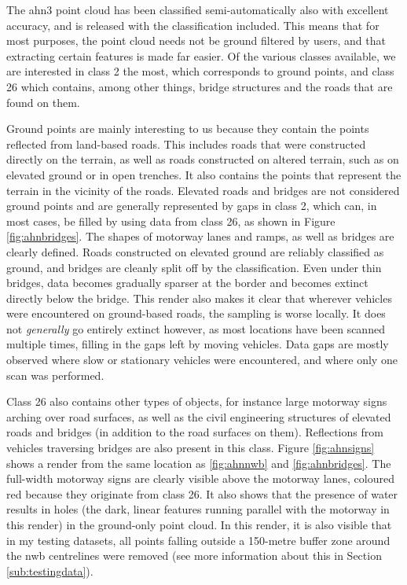 The \ac{ahn3} point cloud has been classified semi-automatically also with excellent accuracy, and is released with the classification included. This means that for most purposes, the point cloud needs not be ground filtered by users, and that extracting certain features is made far easier. Of the various classes available, we are interested in class 2 the most, which corresponds to ground points, and class 26 which contains, among other things, bridge structures and the roads that are found on them.

Ground points are mainly interesting to us because they contain the points reflected from land-based roads. This includes roads that were constructed directly on the terrain, as well as roads constructed on altered terrain, such as on elevated ground or in open trenches. It also contains the points that represent the terrain in the vicinity of the roads. Elevated roads and bridges are not considered ground points and are generally represented by gaps in class 2, which can, in most cases, be filled by using data from class 26, as shown in Figure \ref{fig:ahnbridges}. The shapes of motorway lanes and ramps, as well as bridges are clearly defined. Roads constructed on elevated ground are reliably classified as ground, and bridges are cleanly split off by the classification. Even under thin bridges, data becomes gradually sparser at the border and becomes extinct directly below the bridge. This render also makes it clear that wherever vehicles were encountered on ground-based roads, the sampling is worse locally. It does not \textit{generally} go entirely extinct however, as most locations have been scanned multiple times, filling in the gaps left by moving vehicles. Data gaps are mostly observed where slow or stationary vehicles were encountered, and where only one scan was performed.

Class 26 also contains other types of objects, for instance large motorway signs arching over road surfaces, as well as the civil engineering structures of elevated roads and bridges (in addition to the road surfaces on them). Reflections from vehicles traversing bridges are also present in this class. Figure \ref{fig:ahnsigns} shows a render from the same location as \ref{fig:ahnnwb} and \ref{fig:ahnbridges}. The full-width motorway signs are clearly visible above the motorway lanes, coloured red because they originate from class 26. It also shows that the presence of water results in holes (the dark, linear features running parallel with the motorway in this render) in the ground-only point cloud. In this render, it is also visible that in my testing datasets, all points falling outside a 150-metre buffer zone around the \ac{nwb} centrelines were removed (see more information about this in Section \ref{sub:testingdata}).

